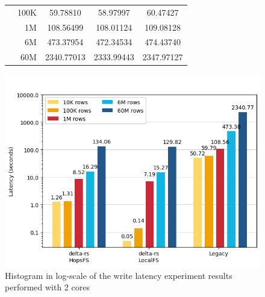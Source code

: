 \begin{figure}
\begin{minipage}[b]{\textwidth}
\begin{tabular}{c r S[table-format=5.5] S[table-format=5.5] S[table-format=5.5]}
                                      & 100K &    59.78810 &   58.97997 &   60.47427\\ 
                                      & 1M   &   108.56499 &  108.01124 &  109.08128\\
                                      & 6M   &   473.37954 &  472.34534 &  474.43740\\
                                      & 60M  &  2340.77013 & 2333.99443 & 2347.97127\\
            \bottomrule
        \end{tabular}
    \end{minipage}
    \begin{minipage}[b]{\textwidth}
        \centering
        \includegraphics[width=\textwidth]{figures/99-appendix/results-diagrams/write/write_time_2_core.png}
        \caption{Histogram in log-scale of the write latency experiment results performed with 2  cores}
        \label{fig:appx_res_write_time_2_cores}
    \end{minipage}
\end{figure}

